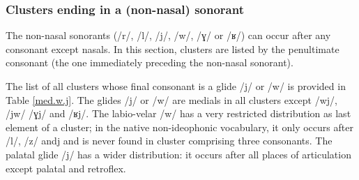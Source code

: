\documentclass[oldfontcommands,oneside,a4paper,11pt]{article}
\newcommand{\ipa}[1]{/#1/} %
\begin{document}
 \subsubsection{Clusters ending in a (non-nasal) sonorant}   \label{sec:medial}
  The non-nasal sonorants (\ipa{r}, \ipa{l}, \ipa{j}, \ipa{w}, \ipa{ɣ} or \ipa{ʁ}) can occur after any consonant except nasals. In this section, clusters are listed by the penultimate consonant  (the one immediately preceding the non-nasal sonorant).  
  
  
  
  The list of all clusters whose final consonant is a glide  \ipa{j} or \ipa{w} is provided in Table \ref{med.w.j}. The glides  \ipa{j} or \ipa{w} are medials in all clusters except \ipa{wj}, \ipa{jw} \ipa{ɣj} and \ipa{ʁj}. The labio-velar \ipa{w} has a very restricted distribution as last element of a cluster; in the native non-ideophonic vocabulary, it only occurs after \ipa{l}, \ipa{z} and{j} and is never found in cluster comprising three consonants. The palatal glide \ipa{j} has a wider distribution: it occurs after all places of articulation except palatal and retroflex.
  
  
  
\end{document}
